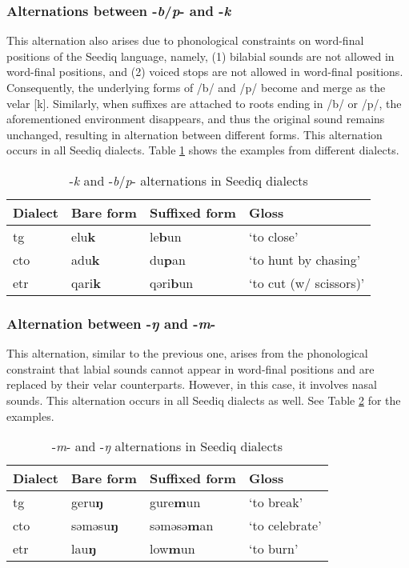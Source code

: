 \subsubsection{Alternations between -\textit{b}/\textit{p}- and -\textit{k}}

This alternation also arises due to phonological constraints on word-final positions of the Seediq language, namely, (1) bilabial sounds are not allowed in word-final positions, and (2) voiced stops are not allowed in word-final positions. Consequently, the underlying forms of /b/ and /p/ become and merge as the velar [k]. Similarly, when suffixes are attached to roots ending in /b/ or /p/, the aforementioned environment disappears, and thus the original sound remains unchanged, resulting in alternation between different forms. This alternation occurs in all Seediq dialects. Table \ref{tab:bpk_alt} shows the examples from different dialects. 

\begin{table}[!htbp]
\centering
\caption{-\textit{k} and -\textit{b}/\textit{p}- alternations in Seediq dialects}
\label{tab:bpk_alt}
\begin{tabular}{llll}
\hline
Dialect   & Bare form & Suffixed form & Gloss                  \\ \hline
\acl{tg}  & elu\textbf{k}      & le\textbf{b}un         & `to close'             \\
\acl{cto} & adu\textbf{k}      & du\textbf{p}an         & `to hunt by chasing'   \\
\acl{etr} & qari\textbf{k}     & qəri\textbf{b}un       & `to cut (w/ scissors)' \\ \hline
\end{tabular}
\end{table}

\subsubsection{Alternation between -\textit{ŋ} and -\textit{m}-}

This alternation, similar to the previous one, arises from the phonological constraint that labial sounds cannot appear in word-final positions and are replaced by their velar counterparts. However, in this case, it involves nasal sounds. This alternation occurs in all Seediq dialects as well. See Table \ref{tab:mng_alt} for the examples. 

\begin{table}[!htbp]
\centering
\caption{-\textit{m}- and -\textit{ŋ} alternations in Seediq dialects}
\label{tab:mng_alt}
\begin{tabular}{llll}
\hline
Dialect   & Bare form & Suffixed form & Gloss          \\ \hline
\acl{tg}  & geru\textbf{ŋ}     & gure\textbf{m}un       & `to break'     \\
\acl{cto} & səməsu\textbf{ŋ}   & səməsə\textbf{m}an     & `to celebrate' \\
\acl{etr} & lau\textbf{ŋ}      & low\textbf{m}un        & `to burn'      \\ \hline
\end{tabular}
\end{table}


